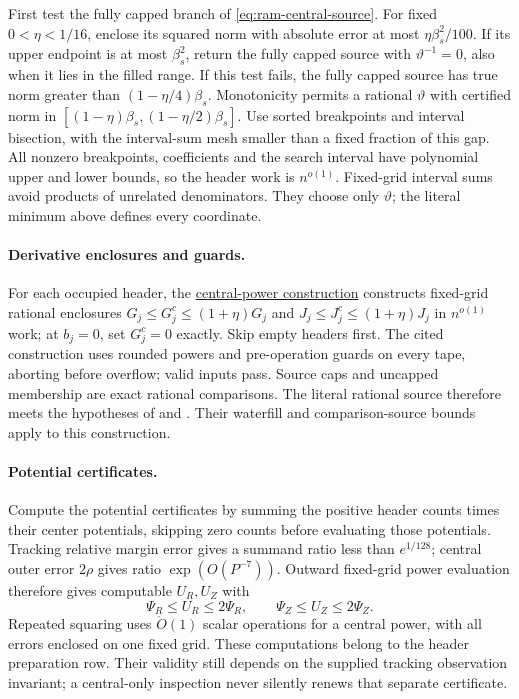 \documentclass[11pt]{article}
\theoremstyle{remark}
\renewcommand{\O}{\ddot{O}}
\begin{document}
First test the fully capped branch of \eqref{eq:ram-central-source}.
For fixed $0<\eta<1/16$, enclose its squared norm with absolute error at most
$\eta\beta_s^2/100$.
If its upper endpoint is at most $\beta_s^2$, return the fully capped source
with $\vartheta^{-1}=0$, also when it lies in the filled range.
If this test fails, the fully capped source has true norm greater than
$(1-\eta/4)\beta_s$.
Monotonicity permits a rational $\vartheta$ with certified norm in
$[(1-\eta)\beta_s,(1-\eta/2)\beta_s]$.
Use sorted breakpoints and interval bisection, with the interval-sum mesh
smaller than a fixed fraction of this gap.
All nonzero breakpoints, coefficients and the search interval have polynomial
upper and lower bounds, so the header work is $n^{o(1)}$.
Fixed-grid interval sums avoid products of unrelated denominators.
They choose only $\vartheta$; the literal minimum above defines every
coordinate.

\paragraph{Derivative enclosures and guards.}
For each occupied header, the \hyperref[par:ram30-central-powers]{central-power
construction} constructs fixed-grid rational enclosures $G_j\le
G^c_j\le(1+\eta)G_j$ and $J_j\le J^c_j\le(1+\eta)J_j$ in $n^{o(1)}$ work; at
$b_j=0$, set $G^c_j=0$ exactly.
Skip empty headers first.
The cited construction uses rounded powers and pre-operation guards on every
tape, aborting before overflow; valid inputs pass.
Source caps and uncapped membership are exact rational comparisons.
The literal rational source therefore meets the hypotheses of
 and .
Their waterfill and comparison-source bounds apply to this construction.

\paragraph{Potential certificates.}
Compute the potential certificates by summing the positive header counts times
their center potentials, skipping zero counts before evaluating those
potentials.
Tracking relative margin error gives a summand ratio less than $e^{1/128}$;
central outer error $2\rho$ gives ratio $\exp(O(P^{-7}))$.
Outward fixed-grid power evaluation therefore gives computable $U_R,U_Z$ with
\[
 \Psi_R\le U_R\le2\Psi_R,\qquad
 \Psi_Z\le U_Z\le2\Psi_Z.
\]
Repeated squaring uses $\O(1)$ scalar operations for a central power, with all
errors enclosed on one fixed grid.
These computations belong to the header preparation row.
Their validity still depends on the supplied tracking observation invariant; a
central-only inspection never silently renews that separate certificate.
\end{document}
